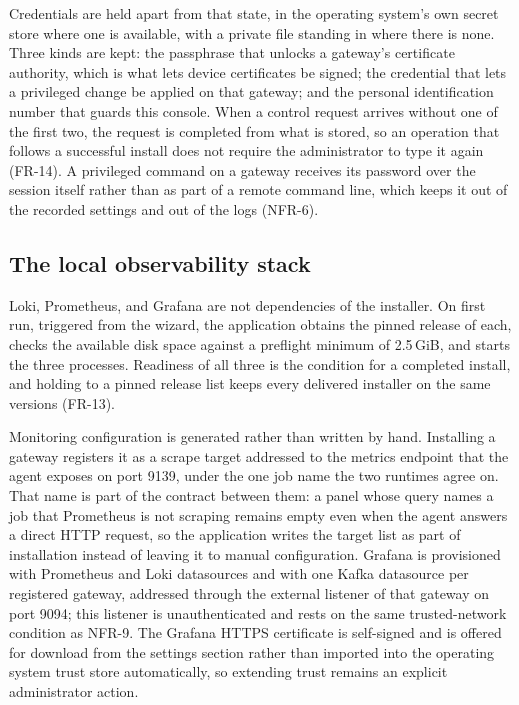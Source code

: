 \documentclass[12pt,a4paper]{report}
\begin{document}
Credentials are held apart from that state, in the operating system's
own secret store where one is available, with a private file standing
in where there is none. Three kinds are kept: the passphrase that
unlocks a gateway's certificate authority, which is what lets device
certificates be signed; the credential that lets a privileged change
be applied on that gateway; and the personal identification number
that guards this console. When a control request arrives without one
of the first two, the request is completed from what is stored, so an
operation that follows a successful install does not require the
administrator to type it again (FR-14). A privileged command on a
gateway receives its password over the session itself rather than as
part of a remote command line, which keeps it out of the recorded
settings and out of the logs (NFR-6).

\subsection{The local observability stack}
\label{sec:mon-telemetry}

Loki, Prometheus, and Grafana are not dependencies of the
installer. On first run, triggered from the wizard, the application
obtains the pinned release of each, checks the available disk space
against a preflight minimum of 2.5\,GiB, and starts the three
processes. Readiness of all three is the condition for a completed
install, and holding to a pinned release list keeps every delivered
installer on the same versions (FR-13).

Monitoring configuration is generated rather than written by hand.
Installing a gateway registers it as a scrape target addressed to the
metrics endpoint that the agent exposes on port 9139, under the one
job name the two runtimes agree on. That name is part of the contract
between them: a panel whose query names a job that Prometheus is not
scraping remains empty even when the agent answers a direct HTTP
request, so the application writes the target list as part of
installation instead of leaving it to manual configuration. Grafana
is provisioned with Prometheus and Loki datasources and with one
Kafka datasource per registered gateway, addressed through the
external listener of that gateway on port 9094; this listener is
unauthenticated and rests on the same trusted-network condition as
NFR-9. The Grafana HTTPS certificate is self-signed and is offered
for download from the settings section rather than imported into the
operating system trust store automatically, so extending trust
remains an explicit administrator action.
\end{document}
